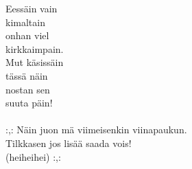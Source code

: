 
            Eessäin vain \\
            kimaltain \\
            onhan viel \\
            kirkkaimpain. \\
            Mut käsissäin \\
            tässä näin \\
            nostan sen \\
            suuta päin! \\
\hspace{10mm} \\
            :,: Näin juon mä viimeisenkin viinapaukun. \\
            Tilkkasen jos lisää saada vois! \\
            (heiheihei) :,: \\
